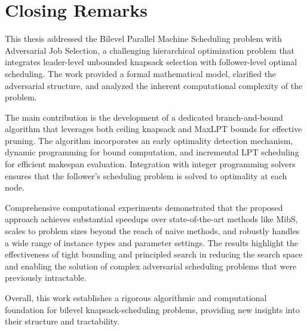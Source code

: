 \section{Closing Remarks}

This thesis addressed the Bilevel Parallel Machine Scheduling problem with Adversarial Job Selection, 
a challenging hierarchical optimization problem that integrates leader-level unbounded knapsack selection with follower-level optimal scheduling. 
The work provided a formal mathematical model, clarified the adversarial structure, and analyzed the inherent computational complexity of the problem.

The main contribution is the development of a dedicated branch-and-bound algorithm that leverages both ceiling knapsack and MaxLPT bounds for effective pruning. 
The algorithm incorporates an early optimality detection mechanism, dynamic programming for bound computation, 
and incremental LPT scheduling for efficient makespan evaluation. Integration with integer programming solvers ensures that the follower's scheduling problem is solved to optimality at each node.

Comprehensive computational experiments demonstrated that the proposed approach achieves substantial speedups over state-of-the-art methods like MibS,
 scales to problem sizes beyond the reach of naive methods, and robustly handles a wide range of instance types and parameter settings. 
 The results highlight the effectiveness of tight bounding and principled search in reducing the search space and enabling the solution of complex adversarial scheduling problems that were previously intractable.

Overall, this work establishes a rigorous algorithmic and computational foundation for bilevel knapsack-scheduling problems, providing new insights into their structure and tractability. 
